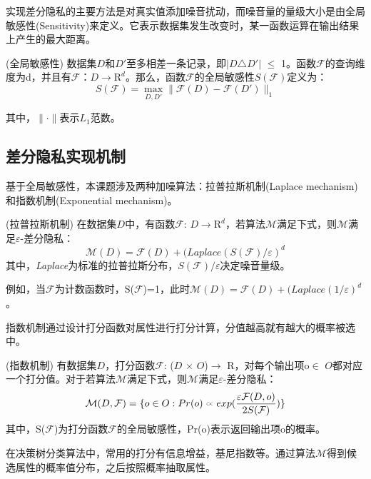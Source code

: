 实现差分隐私的主要方法是对真实值添加噪音扰动，而噪音量的量级大小是由全局敏感性(Sensitivity)来定义。它表示数据集发生改变时，某一函数运算在输出结果上产生的最大距离。

\begin{defn}
	(\textsc{全局敏感性}\cite{Dwork Calibrating}) 数据集$D$和$D'$至多相差一条记录，即$|D$$\triangle$$D'|$ $\leqslant$ 1。函数$\mathcal{F}$的查询维度为d，并且有$\mathcal{F}$：$D \rightarrow \mathrm{R}^d$。那么，函数$\mathcal{F}$的全局敏感性$S(\mathcal{F})$定义为：
\begin{equation}
\label{eq:res2}
	S(\mathcal{F}) = \max \limits_{D,D'} \| \mathcal{F}(D) - \mathcal{F}(D') \|_{1}
\end{equation}

其中，$\|\cdot\|$表示$L_{1}$范数。
\end{defn}



\subsection{差分隐私实现机制}

基于全局敏感性，本课题涉及两种加噪算法：拉普拉斯机制(Laplace mechanism)和指数机制(Exponential mechanism)。

\begin{thm}
	\label{thm:res1}
	(\textsc{拉普拉斯机制}\cite{Dwork Calibrating}) 在数据集$D$中，有函数$\mathcal{F}$: $D\rightarrow \mathrm{R}^d$，若算法$\mathcal{M}$满足下式，则$\mathcal{M}$满足$\varepsilon$-差分隐私：
	\begin{equation}
	\mathcal{M}(D) = \mathcal{F}(D) + (\textit{Laplace}(S(\mathcal{F})/ \varepsilon)^d
	\end{equation}
	其中，\textit{Laplace}为标准的拉普拉斯分布，$S(\mathcal{F})/\varepsilon$决定噪音量级。
\end{thm}
例如，当$\mathcal{F}$为计数函数时，S($\mathcal{F}$)=1，此时$\mathcal{M}(D) = \mathcal{F}(D) + (\textit{Laplace}(1/\varepsilon)^d$。

指数机制通过设计打分函数对属性进行打分计算，分值越高就有越大的概率被选中。
\begin{thm}
	\label{thm:res2}
	(\textsc{指数机制}\cite{exponential}) 有数据集$D$，打分函数$\mathcal{F}$: ($D$ $\times$ $O$)$\rightarrow$ $\mathrm{R}$，对每个输出项o$\in$ $O$都对应一个打分值。对于若算法$\mathcal{M}$满足下式，则$\mathcal{M}$满足$\varepsilon$-差分隐私：
	\begin{equation}
	\mathcal{M}(D,\mathcal{F}) = \{o \in O: Pr(o)\wasypropto exp(\frac{\varepsilon\mathcal{F}(D,o)}{2S(\mathcal{F})}) \}
	\end{equation}
	其中，S($\mathcal{F}$)为打分函数$\mathcal{F}$的全局敏感性，Pr(o)表示返回输出项o的概率。
\end{thm}
在决策树分类算法中，常用的打分有信息增益，基尼指数等。通过算法$\mathcal{M}$得到候选属性的概率值分布，之后按照概率抽取属性。

